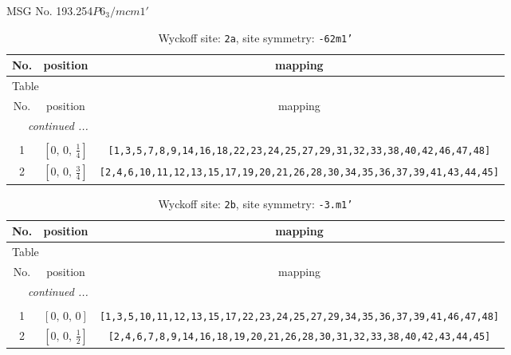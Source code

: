 \documentclass[fleqn,8pt]{jsarticle}
\begin{document}
\setcounter{MaxMatrixCols}{32}

\renewcommand{\tablename}{Table~}
\renewcommand{\figurename}{Figure~}
\begin{center}
\LARGE
MSG No. 193.254\quad$P6_{3}/mcm1'$
\end{center}
\renewcommand{\arraystretch}{1.2}
\begin{longtable}{ccc}
\caption{Wyckoff site: {\tt 2a}, site symmetry: {\tt -62m1'}}
 \\
 \hline \hline
No. & position & mapping \\ \hline \endfirsthead

\multicolumn{2}{l}{\tablename\ \thetable{}} \\
 \hline \hline
No. & position & mapping \\ \hline \endhead

 \hline \hline
\multicolumn{2}{r}{\footnotesize\it continued ...} \\ \endfoot

 \hline \hline
\multicolumn{2}{r}{} \\ \endlastfoot

1 & $\left[ 0,\, 0,\, \frac{1}{4} \right]$ & {\tt [1,3,5,7,8,9,14,16,18,22,23,24,25,27,29,31,32,33,38,40,42,46,47,48]} \\ \hline
2 & $\left[ 0,\, 0,\, \frac{3}{4} \right]$ & {\tt [2,4,6,10,11,12,13,15,17,19,20,21,26,28,30,34,35,36,37,39,41,43,44,45]} \\
\end{longtable}
\renewcommand{\arraystretch}{1.2}
\begin{longtable}{ccc}
\caption{Wyckoff site: {\tt 2b}, site symmetry: {\tt -3.m1'}}
 \\
 \hline \hline
No. & position & mapping \\ \hline \endfirsthead

\multicolumn{2}{l}{\tablename\ \thetable{}} \\
 \hline \hline
No. & position & mapping \\ \hline \endhead

 \hline \hline
\multicolumn{2}{r}{\footnotesize\it continued ...} \\ \endfoot

 \hline \hline
\multicolumn{2}{r}{} \\ \endlastfoot

1 & $\left[ 0,\, 0,\, 0 \right]$ & {\tt [1,3,5,10,11,12,13,15,17,22,23,24,25,27,29,34,35,36,37,39,41,46,47,48]} \\ \hline
2 & $\left[ 0,\, 0,\, \frac{1}{2} \right]$ & {\tt [2,4,6,7,8,9,14,16,18,19,20,21,26,28,30,31,32,33,38,40,42,43,44,45]} \\
\end{longtable}
\end{document}
